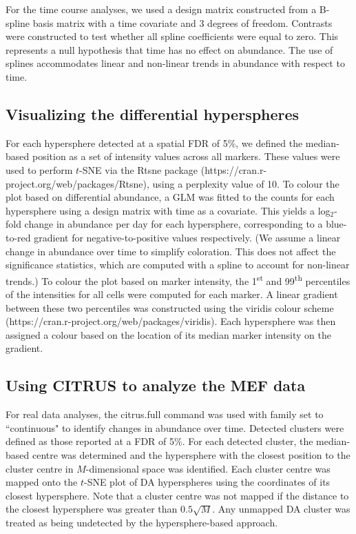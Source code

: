 \documentclass{article}
\begin{document}
For the time course analyses, we used a design matrix constructed from a B-spline basis matrix with a time covariate and 3 degrees of freedom.
Contrasts were constructed to test whether all spline coefficients were equal to zero.
This represents a null hypothesis that time has no effect on abundance.
The use of splines accommodates linear and non-linear trends in abundance with respect to time.

\subsection{Visualizing the differential hyperspheres}
For each hypersphere detected at a spatial FDR of 5\%, we defined the median-based position as a set of intensity values across all markers.
These values were used to perform $t$-SNE via the Rtsne package (https://cran.r-project.org/web/packages/Rtsne), using a perplexity value of 10.
To colour the plot based on differential abundance, a GLM was fitted to the counts for each hypersphere using a design matrix with time as a covariate.
This yields a log$_2$-fold change in abundance per day for each hypersphere, corresponding to a blue-to-red gradient for negative-to-positive values respectively.
(We assume a linear change in abundance over time to simplify coloration.
This does not affect the significance statistics, which are computed with a spline to account for non-linear trends.)
To colour the plot based on marker intensity, the 1\textsuperscript{st} and 99\textsuperscript{th} percentiles of the intensities for all cells were computed for each marker.
A linear gradient between these two percentiles was constructed using the viridis colour scheme (https://cran.r-project.org/web/packages/viridis).
Each hypersphere was then assigned a colour based on the location of its median marker intensity on the gradient. 

\subsection{Using CITRUS to analyze the MEF data}
For real data analyses, the citrus.full command was used with family set to ``continuous" to identify changes in abundance over time. 
    Detected clusters were defined as those reported at a FDR of 5\%.
    For each detected cluster, the median-based centre was determined and the hypersphere with the closest position to the cluster centre in $M$-dimensional space was identified.
Each cluster centre was mapped onto the $t$-SNE plot of DA hyperspheres using the coordinates of its closest hypersphere.
Note that a cluster centre was not mapped if the distance to the closest hypersphere was greater than $0.5\sqrt{M}$.
Any unmapped DA cluster was treated as being undetected by the hypersphere-based approach.
\end{document}
